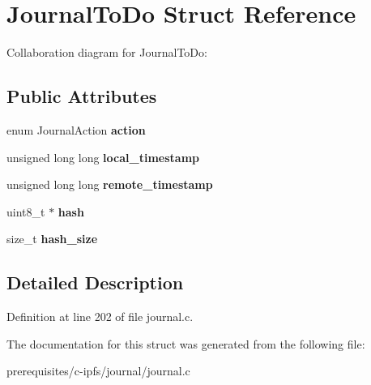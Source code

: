 \hypertarget{struct_journal_to_do}{}\section{Journal\+To\+Do Struct Reference}
\label{struct_journal_to_do}


Collaboration diagram for Journal\+To\+Do\+:
\subsection*{Public Attributes}
\begin{DoxyCompactItemize}
\item 
\mbox{\label{struct_journal_to_do_a3640fce2dc9a12e07d9f73c3a95a0ec4}} 
enum Journal\+Action {\bfseries action}
\item 
\mbox{\label{struct_journal_to_do_a4260a3ea97631b612980b4cbe17a53be}} 
unsigned long long {\bfseries local\+\_\+timestamp}
\item 
\mbox{\label{struct_journal_to_do_a31c44c01e6155541c1654869a40cf75c}} 
unsigned long long {\bfseries remote\+\_\+timestamp}
\item 
\mbox{\label{struct_journal_to_do_ac1a28c55fe1e7b77047b029868f233ec}} 
uint8\+\_\+t $\ast$ {\bfseries hash}
\item 
\mbox{\label{struct_journal_to_do_af32bebb511d2fc9e520f030c92a66583}} 
size\+\_\+t {\bfseries hash\+\_\+size}
\end{DoxyCompactItemize}


\subsection{Detailed Description}


Definition at line 202 of file journal.\+c.



The documentation for this struct was generated from the following file\+:\begin{DoxyCompactItemize}
\item 
prerequisites/c-\/ipfs/journal/journal.\+c\end{DoxyCompactItemize}
